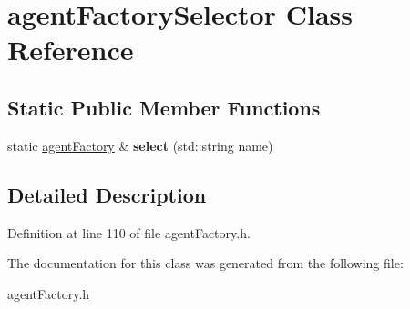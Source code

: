 \hypertarget{classagentFactorySelector}{}\section{agent\+Factory\+Selector Class Reference}
\label{classagentFactorySelector}
\subsection*{Static Public Member Functions}
\begin{DoxyCompactItemize}
\item 
\mbox{\label{classagentFactorySelector_a10639ee22ff121232ffe1bbd73d0f19e}} 
static \mbox{\hyperlink{classagentFactory}{agent\+Factory}} \& {\bfseries select} (std\+::string name)
\end{DoxyCompactItemize}


\subsection{Detailed Description}


Definition at line 110 of file agent\+Factory.\+h.



The documentation for this class was generated from the following file\+:\begin{DoxyCompactItemize}
\item 
agent\+Factory.\+h\end{DoxyCompactItemize}
